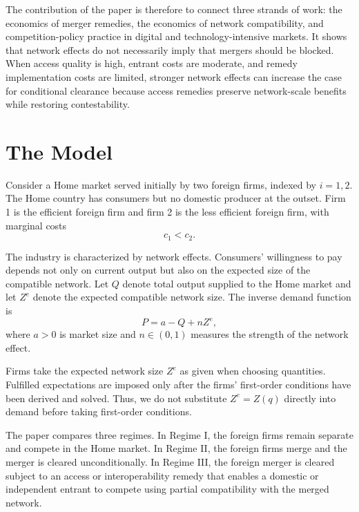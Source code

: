 \documentclass[12pt]{article}
\begin{document}
The contribution of the paper is therefore to connect three strands of work: the economics of merger remedies, the economics of network compatibility, and competition-policy practice in digital and technology-intensive markets. It shows that network effects do not necessarily imply that mergers should be blocked. When access quality is high, entrant costs are moderate, and remedy implementation costs are limited, stronger network effects can increase the case for conditional clearance because access remedies preserve network-scale benefits while restoring contestability.

\section{The Model}\label{sec:model}

Consider a Home market served initially by two foreign firms, indexed by $i=1,2$. The Home country has consumers but no domestic producer at the outset. Firm 1 is the efficient foreign firm and firm 2 is the less efficient foreign firm, with marginal costs
\begin{equation}
 c_1<c_2.
\end{equation}

The industry is characterized by network effects. Consumers' willingness to pay depends not only on current output but also on the expected size of the compatible network. Let $Q$ denote total output supplied to the Home market and let $Z^e$ denote the expected compatible network size. The inverse demand function is
\begin{equation}
P=a-Q+nZ^e,
\label{eq:demand_general}
\end{equation}
where $a>0$ is market size and $n\in(0,1)$ measures the strength of the network effect.

Firms take the expected network size $Z^e$ as given when choosing quantities. Fulfilled expectations are imposed only after the firms' first-order conditions have been derived and solved. Thus, we do not substitute $Z^e=Z(q)$ directly into demand before taking first-order conditions.

The paper compares three regimes. In Regime I, the foreign firms remain separate and compete in the Home market. In Regime II, the foreign firms merge and the merger is cleared unconditionally. In Regime III, the foreign merger is cleared subject to an access or interoperability remedy that enables a domestic or independent entrant to compete using partial compatibility with the merged network.
\end{document}

